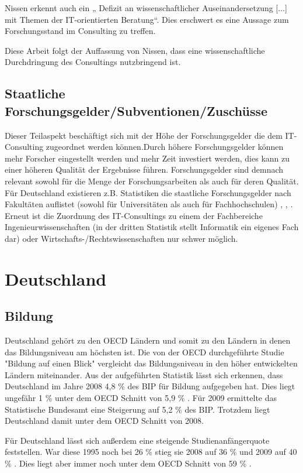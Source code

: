 Nissen erkennt auch ein „ Defizit an wissenschaftlicher Auseinandersetzung [...] mit Themen der IT-orientierten Beratung“. Dies erschwert es eine Aussage zum Forschungsstand im Consulting zu treffen.

Diese Arbeit folgt der Auffassung von Nissen, dass eine wissenschaftliche Durchdringung des Consultings nutzbringend ist.

\subsection{Staatliche Forschungsgelder/Subventionen/Zuschüsse}
Dieser Teilaspekt beschäftigt sich mit der Höhe der Forschungsgelder die dem IT-Consulting zugeordnet werden können.Durch höhere Forschungsgelder können mehr Forscher eingestellt werden und mehr Zeit investiert werden, dies kann zu einer höheren Qualität der Ergebnisse führen. Forschungsgelder sind demnach relevant sowohl für die Menge der Forschungsarbeiten als auch für deren Qualität.
Für Deutschland existieren z.B. Statistiken die staatliche Forschungsgelder nach Fakultäten auflistet (sowohl für Universitäten als auch für Fachhochschulen) \cite {ausgabenfakuni}, \cite {ausgabenfakfach}, \cite {ausgabenbmbf}. Erneut ist die Zuordnung des IT-Consultings zu einem der Fachbereiche Ingenieurwissenschaften (in der dritten Statistik stellt Informatik ein eigenes Fach dar) oder Wirtschafts-/Rechtswissenschaften nur schwer möglich.


\section{Deutschland}
\subsection{Bildung}
Deutschland gehört zu den OECD Ländern und somit zu den Ländern in denen das Bildungsniveau am höchsten ist. Die von der OECD durchgeführte Studie "Bildung auf einen Blick" \cite{oecd2} vergleicht das Bildungsniveau in den höher entwickelten Ländern miteinander. Aus der aufgeführten Statistik lässt sich erkennen, dass Deutschland im Jahre 2008 4,8 \% des BIP für Bildung aufgegeben hat. Dies liegt ungefähr 1 \% unter dem OECD Schnitt von 5,9 \% . Für 2009 ermittelte das Statistische Bundesamt eine Steigerung auf 5,2 \% des BIP. Trotzdem liegt Deutschland damit unter dem OECD Schnitt von 2008.

Für Deutschland lässt sich außerdem eine steigende Studienanfängerquote feststellen. War diese 1995 noch bei 26 \%  stieg sie 2008 auf 36 \%  und 2009 auf 40 \% . Dies liegt aber immer noch unter dem OECD Schnitt von 59 \% .

